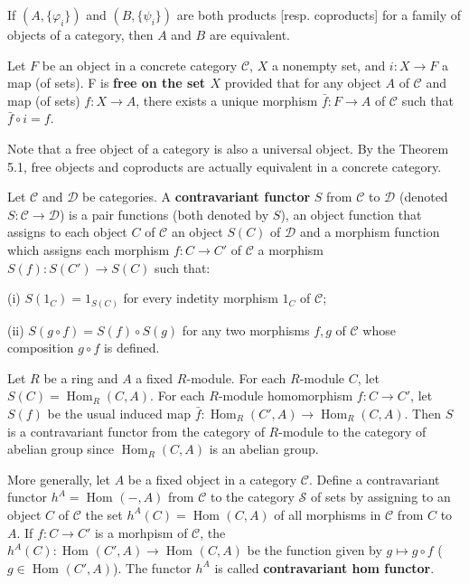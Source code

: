 \documentclass{article}
\DeclareMathOperator{\Hom}{Hom}
\begin{document}
\begin{theorem}
    If $(A,\{\varphi_i\})$ and $(B,\{\psi_i\})$ are both products [resp. coproducts] for a family of objects of a category, then $A$ and $B$ are equivalent.
\end{theorem}

\begin{definition}
    Let $F$ be an object in a concrete category $\mathscr{C}$, $X$ a nonempty set, and $i:X\to F$ a map (of sets). F is \textbf{free on the set $X$} provided that for any object $A$ of $\mathscr{C}$ and map (of sets) $f:X\to A$, there exists a unique morphism $\bar{f}:F\to A$ of $\mathscr{C}$ such that $\bar{f} \circ i = f$.
\end{definition}

Note that a free object of a category is also a universal object. By the Theorem 5.1, free objects and coproducts are actually equivalent in a concrete category.

\begin{definition}
    Let $\mathscr{C}$ and $\mathscr{D}$ be categories. A \textbf{contravariant functor} $S$ from $\mathscr{C}$ to $\mathscr{D}$ (denoted $S:\mathscr{C}\to \mathscr{D}$) is a pair functions (both denoted by $S$), an object function that assigns to each object $C$ of $\mathscr{C}$ an object $S(C)$ of $\mathscr{D}$ and a morphism function which assigns each morphism $f:C\to C'$ of $\mathscr{C}$ a morphism $S(f):S(C')\to S(C)$ such that:

    (i) $S(1_C)=1_{S(C)}$ for every indetity morphism $1_C$ of $\mathscr{C}$;

    (ii) $S(g \circ f)=S(f) \circ S(g)$ for any two morphisms $f,g$ of $\mathscr{C}$ whose composition $g \circ f$ is defined.
\end{definition}


\begin{example}
    Let $R$ be a ring and $A$ a fixed $R$-module. For each $R$-module $C$, let $S(C)=\Hom_{R}(C, A)$. For each $R$-module homomorphism $f:C \to C'$, let $S(f)$ be the usual induced map $\bar{f}:\Hom_{R}(C', A)\to \Hom_{R}(C, A)$. Then $S$ is a contravariant functor from the category of $R$-module to the category of abelian group since $\Hom_{R}(C, A)$ is an abelian group.

    More generally, let $A$ be a fixed object in a category $\mathscr{C}$. Define a contravariant functor $h^A=\Hom_{}(-, A)$ from $\mathscr{C}$ to the category $\mathscr{S}$ of sets by assigning to an object $C$ of $\mathscr{C}$ the set $h^A(C)=\Hom_{}(C, A)$ of all morphisms in $\mathscr{C}$ from $C$ to $A$. If $f:C\to C'$ is a morhpism of $\mathscr{C}$, the $h^A(C):\Hom_{}(C', A)\to \Hom_{}(C, A)$ be the function given by $g \mapsto g \circ f$ ($g \in \Hom_{}(C', A)$). The functor $h^A$ is called \textbf{contravariant hom functor}.
\end{example}
\end{document}
